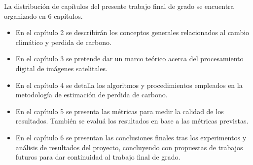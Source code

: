 La distribución de capítulos del presente trabajo final de grado se encuentra organizado en 6 capítulos.
\begin{itemize}

\item En el cap\'itulo 2  se describir\'an los conceptos generales relacionados al cambio clim\'atico y perdida de carbono.

\item En el cap\'itulo 3 se pretende dar un marco te\'orico acerca del procesamiento digital de im\'agenes satelitales.
\item En el cap\'itulo 4  se detalla los algoritmos y procedimientos empleados en la metodolog\'ia de estimaci\'on de perdida de carbono.

\item En el cap\'itulo 5  se presenta las m\'etricas para medir la calidad de los resultados. Tambi\'en se evalu\'a los resultados en base a las m\'etricas previstas.

\item En el cap\'itulo 6 se presentan las conclusiones finales tras los experimentos y an\'alisis de resultados del proyecto, concluyendo con propuestas de trabajos futuros para dar continuidad al trabajo final de grado.

\end{itemize}
